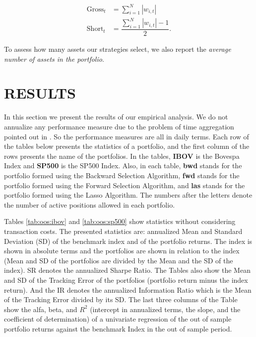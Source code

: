 \documentclass[12pt,oneside,a4paper]{memoir}
\begin{document}
\vspace{-18 pt}
\begin{align*}
\label{gross}
\text{Gross}_{t} &= \sum_{i=1}^{N} |w_{i,t}|
\\
\label{short}
\text{Short}_{t} &= \dfrac{\sum_{i=1}^{N} |w_{i,t}| - 1}{2}.
\end{align*}

To assess how many assets our strategies select, we also report the \textit{average number of assets in the portfolio}.

\section{RESULTS} \label{sec:results:it}

In this section we present the results of our empirical analysis.
We do not annualize any performance measure due to the problem of time aggregation pointed out in .
So the performance measures are all in daily terms.
Each row of the tables below presents the statistics of a portfolio, and the first column of the rows presents the name of the portfolios.
In the tables, \textbf{IBOV} is the Bovespa Index and \textbf{SP500} is the SP500 Index. 
Also, in each table,
\textbf{bwd} stands for the portfolio formed using the Backward Selection Algorithm, 
\textbf{fwd} stands for the portfolio formed using the Forward Selection Algorithm, and
\textbf{las} stands for the portfolio formed using the Lasso Algorithm.
The numbers after the letters denote the number of active positions allowed in each portfolio.


Tables \ref{tab:oos:ibov} and \ref{tab:oos:sp500} show statistics without considering transaction costs.
The presented statistics are: annualized Mean and Standard Deviation (SD) of the benchmark index and of the portfolio returns.
The index is shown in absolute terms and the portfolios are shown in relation to the index (Mean and SD of the portfolios are divided by the Mean and the SD of the index).
SR denotes the annualized Sharpe Ratio.
The Tables also show the Mean and SD of the Tracking Error of the portfolios (portfolio return minus the index return).
And the IR denotes the annualized Information Ratio which is the Mean of the Tracking Error divided by its SD.
The last three columns of the Table show the alfa, beta, and $R^2$ (intercept in annualized terms, the slope, and the coefficient of determination) of a univariate regression of the out of sample portfolio returns against the benchmark Index in the out of sample period.
\end{document}
